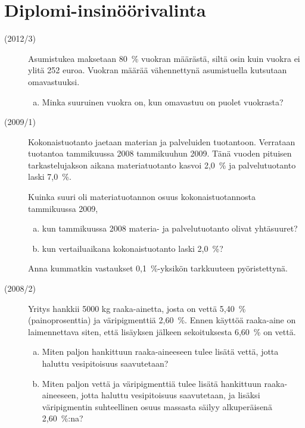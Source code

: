\section{Diplomi-insinöörivalinta}
\begin{description}
	\item[(2012/3)] Asumistukea maksetaan 80~\% vuokran määrästä, siltä osin kuin
        vuokra ei ylitä 252 euroa. Vuokran määrää vähennettynä asumistuella
        kutsutaan omavastuuksi.
        
		\begin{enumerate}[(a)]
			\item Minka suuruinen vuokra on, kun omavastuu on puolet vuokrasta?
		\end{enumerate}
	
	\item[(2009/1)] Kokonaistuotanto jaetaan materian ja palveluiden tuotantoon.
        Verrataan tuotantoa tammikuussa 2008 tammikuuhun 2009. Tänä vuoden pituisen
        tarkastelujakson aikana materiatuotanto kasvoi 2,0~\% ja palvelutuotanto laski 7,0~\%.
	
	   Kuinka suuri oli materiatuotannon osuus kokonaistuotannosta tammikuussa 2009,
	   
    	\begin{enumerate}[(a)]
    		\item kun tammikuussa 2008 materia- ja palvelutuotanto olivat yhtäsuuret?
    		\item kun vertailuaikana kokonaistuotanto laski 2,0~\%?
    	\end{enumerate}
    	
	   Anna kummatkin vastaukset 0,1~\%-yksikön tarkkuuteen pyöristettynä.

	\item[(2008/2)] Yritys hankkii 5000 kg raaka-ainetta, josta on vettä 5,40~\%
        (painoprosenttia) ja väripigmenttiä 2,60~\%. Ennen käyttöä raaka-aine on
        laimennettava siten, että lisäyksen jälkeen sekoituksesta 6,60~\% on vettä.
	
    	\begin{enumerate}[(a)]
    		\item Miten paljon hankittuun raaka-aineeseen tulee lisätä vettä,
                jotta haluttu vesipitoisuus saavutetaan?
    		\item Miten paljon vettä ja väripigmenttiä tulee lisätä hankittuun
                raaka-aineeseen, jotta haluttu vesipitoisuus saavutetaan, ja lisäksi
                väripigmentin suhteellinen osuus massasta säilyy alkuperäisenä 2,60~\%:na?
    	\end{enumerate}
    	

\end{description}
